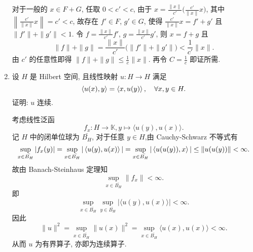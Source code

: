 \begin{enumerate}
\begin{answer}
      对于一般的 $x\in F+G$, 任取 $0<c'<c$, 由于 $x=\frac{\|x\|}{c'}\bigl(\frac{c'}{\|x\|}x\bigr)$,
      其中 $\left\|\frac{c'}{\|x\|}x\right\|=c'<c$, 故存在 $f'\in F$, $g'\in G$,
      使得 $\frac{c'}{\|x\|}x=f'+g'$ 且 $\|f'\|+\|g'\|<1$.
      令 $f=\frac{\|x\|}{c'}f'$, $g=\frac{\|x\|}{c'}g'$, 则
      $x=f+g$ 且
      \[\|f\|+\|g\|=\frac{\|x\|}{c'}\bigl(\|f'\|+\|g'\|\bigr)<\frac{1}{c'}\|x\|.\]
      由 $c'$ 的任意性即得 $\|f\|+\|g\|\leq\frac{1}{c}\|x\|$.
      再令 $C=\frac{1}{c}$ 即证所需.
    \end{answer}
  \item 设 $H$ 是 Hilbert 空间, 且线性映射 $u:H\to H$ 满足
  \[\left\langle u(x),y\right\rangle=\left\langle x,u(y)\right\rangle,\quad\forall x,y\in H.\]
  证明: $u$ 连续.
    \begin{answer}
      考虑线性泛函
      \[f_x:H\to\mathbb{K},y\mapsto\langle u(y),u(x)\rangle.\]
      记 $H$ 中的闭单位球为 $\bar{B_H}$, 对于任意 $y\in H$,由 Cauchy-Schwarz 不等式有
      \[\sup_{x\in\bar{B_H}}|f_x(y)|=\sup_{x\in\bar{B_H}}|\left\langle u(y),u(x)\right\rangle|=\sup_{x\in \bar{B_H}}|\left\langle u(u(y)),x\right\rangle|\leq\|u(u(y))\|<\infty.\]
      故由 Banach-Steinhaus 定理知
      \[\sup_{x\in \bar{B_H}}\|f_x\|<\infty.\]
      即
      \[\sup_{x\in \bar{B_H}}\sup_{y\in \bar{B_H}}|\langle u(y),u(x )\rangle|<\infty.\]
      因此
      \[\|u\|^2=\sup_{x\in\bar{B_H}}\|u(x)\|^2=\sup_{x\in \bar{B_H}}\langle u(x),u(x)\rangle<\infty.\]
      从而 $u$ 为有界算子, 亦即为连续算子.
    \end{answer}
\end{enumerate}




